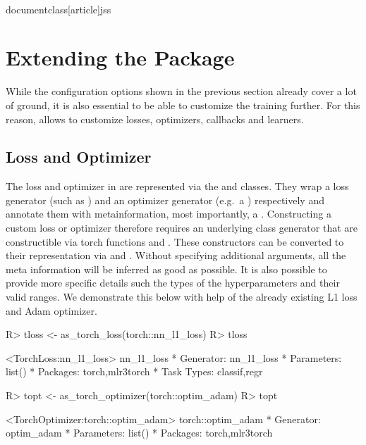 \\documentclass[article]{jss}
\theoremstyle{definition}
\begin{document}
\section{Extending the Package}\label{sec:extending}

While the configuration options shown in the previous section already cover a lot of ground, it is also essential to be able to customize the training further.
For this reason,  allows to customize losses, optimizers, callbacks and learners.

\subsection{Loss and Optimizer}\label{sec:extending-loss-opt}

The loss and optimizer in \mlrttorch{} are represented via the  and  classes.
They wrap a loss generator (such as ) and an optimizer generator (e.g.~a ) respectively and annotate them with metainformation, most importantly, a .
Constructing a custom loss or optimizer therefore requires an underlying class generator that are constructible via torch functions  and .
These constructors can be converted to their  representation via  and .
Without specifying additional arguments, all the meta information will be inferred as good as possible.
It is also possible to provide more specific details such the types of the hyperparameters and their valid ranges.
We demonstrate this below with help of the already existing L1 loss and Adam optimizer.

\begin{CodeInput}
R> tloss <- as_torch_loss(torch::nn_l1_loss)
R> tloss
\end{CodeInput}
\begin{CodeOutput}
<TorchLoss:nn_l1_loss> nn_l1_loss
* Generator: nn_l1_loss
* Parameters: list()
* Packages: torch,mlr3torch
* Task Types: classif,regr
\end{CodeOutput}
\begin{CodeInput}
R> topt <- as_torch_optimizer(torch::optim_adam)
R> topt
\end{CodeInput}
\begin{CodeOutput}
<TorchOptimizer:torch::optim_adam> torch::optim_adam
* Generator: optim_adam
* Parameters: list()
* Packages: torch,mlr3torch
\end{CodeOutput}
\end{document}
